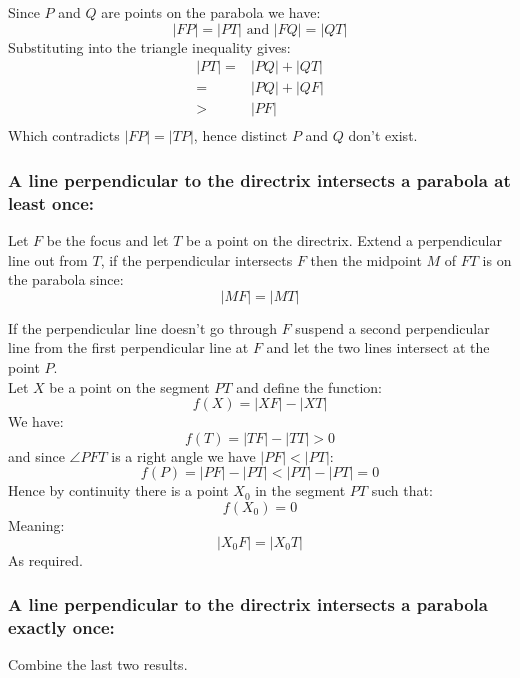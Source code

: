 Since $P$ and $Q$ are points on the parabola we have:
\[|FP| = |PT|\text{ and }|FQ| = |QT|\]
Substituting into the triangle inequality gives:
\begin{equation*}
\begin{aligned}
	|PT| =& |PQ|+|QT| \\
	=& |PQ| + |QF| \\
	>& |PF| \\
\end{aligned}
\end{equation*}
Which contradicts $|FP|=|TP|$,
hence distinct $P$ and $Q$ don't exist.

\subsubsection{A line perpendicular to the directrix intersects a parabola at least once:}
\begin{center}
\end{center}
Let $F$ be the focus and let $T$ be a point on the directrix.
Extend a perpendicular line out from $T$, 
if the perpendicular intersects $F$ then the midpoint $M$ of $FT$ is on the parabola since:
\[|MF| = |MT|\]

If the perpendicular line doesn't go through $F$ suspend a second perpendicular line from the first perpendicular line at $F$ and let the two lines intersect at the point $P$.
\\

Let $X$ be a point on the segment $PT$ and define the function:
\[f(X) = |XF|-|XT|\]
We have:
\[f(T) = |TF|-|TT| > 0\]
and since $\angle PFT$ is a right angle we have $|PF| < |PT|$:
\[f(P) = |PF|-|PT| < |PT| -|PT| = 0\]
Hence by continuity there is a point $X_0$ in the segment $PT$ such that:
\[f(X_0) = 0\]
Meaning:
\[|X_0F| = |X_0T|\]
As required.

\subsubsection{A line perpendicular to the directrix intersects a parabola exactly once:}
Combine the last two results.

